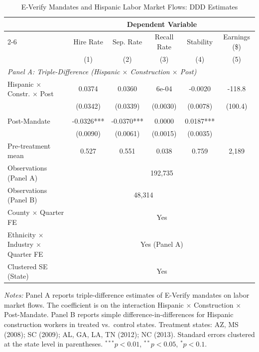\begin{table}[H]
\centering
\footnotesize
\begin{threeparttable}
\caption{E-Verify Mandates and Hispanic Labor Market Flows: DDD Estimates}
\label{tab:ddd}
\begin{tabular}{l ccccc}
\toprule
 & \multicolumn{5}{c}{Dependent Variable} \\
\cmidrule(lr){2-6}
 & Hire Rate & Sep. Rate & Recall Rate & Stability & Earnings (\$) \\
 & (1) & (2) & (3) & (4) & (5) \\
\midrule
\multicolumn{6}{l}{\textit{Panel A: Triple-Difference (Hispanic $\times$ Construction $\times$ Post)}} \\
Hispanic $\times$ Constr. $\times$ Post & 0.0374 & 0.0360 & 6e-04 & -0.0020 & -118.8 \\
 & (0.0342) & (0.0339) & (0.0030) & (0.0078) & (100.4) \\
\addlinespace
\multicolumn{6}{l}{\textit{Panel B: Difference-in-Differences (Hispanic Construction Only)}} \\
Post-Mandate & -0.0326*** & -0.0370*** & 0.0000 & 0.0187*** & \\
 & (0.0090) & (0.0061) & (0.0015) & (0.0035) & \\
\midrule
Pre-treatment mean & 0.527 & 0.551 & 0.038 & 0.759 & 2,189 \\
Observations (Panel A) & \multicolumn{5}{c}{192,735} \\
Observations (Panel B) & \multicolumn{4}{c}{48,314} & \\
County $\times$ Quarter FE & \multicolumn{5}{c}{Yes} \\
Ethnicity $\times$ Industry $\times$ Quarter FE & \multicolumn{5}{c}{Yes (Panel A)} \\
Clustered SE (State) & \multicolumn{5}{c}{Yes} \\
\bottomrule
\end{tabular}
\begin{tablenotes}[flushleft]\footnotesize
\item \textit{Notes:} Panel A reports triple-difference estimates of E-Verify mandates on labor market flows. The coefficient is on the interaction Hispanic $\times$ Construction $\times$ Post-Mandate. Panel B reports simple difference-in-differences for Hispanic construction workers in treated vs.\ control states. Treatment states: AZ, MS (2008); SC (2009); AL, GA, LA, TN (2012); NC (2013). Standard errors clustered at the state level in parentheses. $^{***}p<0.01$, $^{**}p<0.05$, $^{*}p<0.1$.
\end{tablenotes}
\end{threeparttable}
\end{table}
